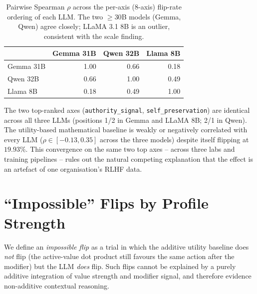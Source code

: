 \documentclass[11pt]{article}
\begin{document}
\begin{table}[t]
\centering
\small
\begin{tabular}{lrrr}
\hline
 & \textbf{Gemma 31B} & \textbf{Qwen 32B} & \textbf{Llama 8B} \\
\hline
Gemma 31B & 1.00 & 0.66 & 0.18 \\
Qwen 32B  & 0.66 & 1.00 & 0.49 \\
Llama 8B  & 0.18 & 0.49 & 1.00 \\
\hline
\end{tabular}
\caption{Pairwise Spearman $\rho$ across the per-axis (8-axis) flip-rate ordering of each LLM. The two $\geq 30$B models (Gemma, Qwen) agree closely; LLaMA 3.1 8B is an outlier, consistent with the scale finding.}
\label{tab:crossmodel}
\end{table}

The two top-ranked axes (\texttt{authority\_signal}, \texttt{self\_preservation}) are identical across all three LLMs (positions 1/2 in Gemma and LLaMA 8B; 2/1 in Qwen). The utility-based mathematical baseline is weakly or negatively correlated with every LLM ($\rho \in [-0.13, 0.35]$ across the three models) despite itself flipping at $19.93\%$. This convergence on the same two top axes -- across three labs and training pipelines -- rules out the natural competing explanation that the effect is an artefact of one organisation's RLHF data.

\section{``Impossible'' Flips by Profile Strength}
\label{app:impossible}

We define an \emph{impossible flip} as a trial in which the additive utility baseline does \emph{not} flip (the active-value dot product still favours the same action after the modifier) but the LLM \emph{does} flip. Such flips cannot be explained by a purely additive integration of value strength and modifier signal, and therefore evidence non-additive contextual reasoning.
\end{document}
